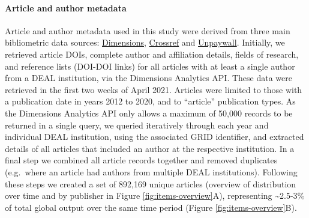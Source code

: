\documentclass[
]{article}
\begin{document}
\hypertarget{article-and-author-metadata}{%
\paragraph{Article and author metadata}\label{article-and-author-metadata}}

Article and author metadata used in this study were derived from three main bibliometric data sources: \href{https://www.dimensions.ai/}{Dimensions}, \href{http://crossref.org/}{Crossref} and \href{https://unpaywall.org/}{Unpaywall}. Initially, we retrieved article DOIs, complete author and affiliation details, fields of research, and reference lists (DOI-DOI links) for all articles with at least a single author from a DEAL institution, via the Dimensions Analytics API. These data were retrieved in the first two weeks of April 2021. Articles were limited to those with a publication date in years 2012 to 2020, and to ``article'' publication types. As the Dimensions Analytics API only allows a maximum of 50,000 records to be returned in a single query, we queried iteratively through each year and individual DEAL institution, using the associated GRID identifier, and extracted details of all articles that included an author at the respective institution. In a final step we combined all article records together and removed duplicates (e.g.~where an article had authors from multiple DEAL institutions). Following these steps we created a set of 892,169 unique articles (overview of distribution over time and by publisher in Figure \ref{fig:items-overview}A), representing \textasciitilde2.5-3\% of total global output over the same time period (Figure \ref{fig:items-overview}B).
\end{document}
